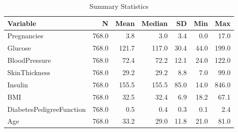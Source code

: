 \begin{table}
\caption{Summary Statistics}
\label{tab:summary_stats}
\begin{tabular}{lrrrrrr}
\toprule
Variable & N & Mean & Median & SD & Min & Max \\
\midrule
Pregnancies & 768.0 & 3.8 & 3.0 & 3.4 & 0.0 & 17.0 \\
Glucose & 768.0 & 121.7 & 117.0 & 30.4 & 44.0 & 199.0 \\
BloodPressure & 768.0 & 72.4 & 72.2 & 12.1 & 24.0 & 122.0 \\
SkinThickness & 768.0 & 29.2 & 29.2 & 8.8 & 7.0 & 99.0 \\
Insulin & 768.0 & 155.5 & 155.5 & 85.0 & 14.0 & 846.0 \\
BMI & 768.0 & 32.5 & 32.4 & 6.9 & 18.2 & 67.1 \\
DiabetesPedigreeFunction & 768.0 & 0.5 & 0.4 & 0.3 & 0.1 & 2.4 \\
Age & 768.0 & 33.2 & 29.0 & 11.8 & 21.0 & 81.0 \\
\bottomrule
\end{tabular}
\end{table}
